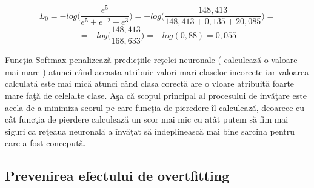 $$L_0 = - log \bigg(\frac{e^{5}}{e^{5} + e^{-2} + e^{3}} \bigg) = - log \bigg(\frac{148,413}{148,413 + 0,135 + 20,085}\bigg) =  $$
$$ = - log\bigg( \frac{148,413}{168,633} \bigg) = -log(0,88) = 0,055 $$

Func\c{t}ia Softmax penalizeaz\u{a} predic\c{t}iile re\c{t}elei neuronale ( calculeaz\u{a} o valoare mai mare ) atunci c\^{a}nd aceasta atribuie valori mari claselor incorecte iar valoarea calculat\u{a} este mai mic\u{a} atunci c\^{a}nd clasa corect\u{a} are o vloare atribuit\u{a} foarte mare fa\c{t}\u{a} de celelalte clase. A\c{s}a c\u{a} scopul principal al procesului de inv\u{a}\c{t}are este acela de a minimiza scorul pe care func\c{t}ia de pieredere \^{i}l calculeaz\u{a}, deoarece cu c\^{a}t func\c{t}ia de pierdere calculeaz\u{a} un scor mai mic cu at\^{a}t putem s\u{a} fim mai siguri ca re\c{t}eaua neuronal\u{a} a \^{i}nv\u{a}\c{t}at s\u{a} \^{i}ndeplineasc\u{a} mai bine sarcina pentru care a fost conceput\u{a}.

\subsection{Prevenirea efectului de overtfitting}